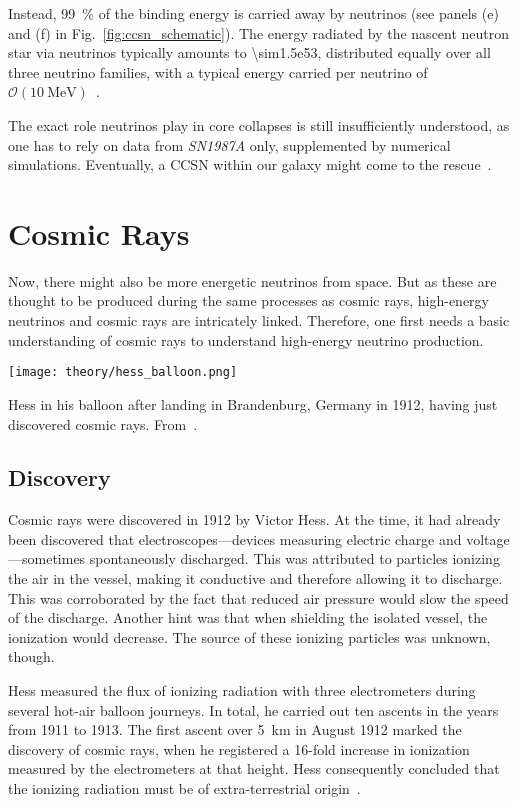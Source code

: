 Instead, \SI{99}{\percent} of the binding energy is carried away by neutrinos (see panels (e) and (f) in Fig.~\ref{fig:ccsn_schematic}). The energy radiated by the nascent neutron star via neutrinos typically amounts to \SI{\sim1.5e53}{\erg}, distributed equally over all three neutrino families, with a typical energy carried per neutrino of $\mathcal{O}(\SI{10}{\mega\eV})$~.

The exact role neutrinos play in core collapses is still insufficiently understood, as one has to rely on data from \emph{SN1987A} only, supplemented by numerical simulations. Eventually, a CCSN within our galaxy might come to the rescue~.

\section{Cosmic Rays}\label{cosmic_rays}

Now, there might also be more energetic neutrinos from space. But as these are thought to be produced during the same processes as cosmic rays, high-energy neutrinos and cosmic rays are intricately linked. Therefore, one first needs a basic understanding of cosmic rays to understand high-energy neutrino production.

\begin{marginfigure}
  \texttt{[image: theory/hess\_balloon.png]}
  \caption[Hess in his balloon]{Hess in his balloon after landing in Brandenburg, Germany in 1912, having just discovered cosmic rays. From~\cite{Steinmaurer1985}.}
\end{marginfigure}

\subsection{Discovery}

Cosmic rays were discovered in 1912 by Victor Hess. At the time, it had already been discovered that electroscopes---devices measuring electric charge and voltage---sometimes spontaneously discharged. This was attributed to particles ionizing the air in the vessel, making it conductive and therefore allowing it to discharge. This was corroborated by the fact that reduced air pressure would slow the speed of the discharge. Another hint was that when shielding the isolated vessel, the ionization would decrease. The source of these ionizing particles was unknown, though.

Hess measured the flux of ionizing radiation with three electrometers during several hot-air balloon journeys. In total, he carried out ten ascents in the years from 1911 to 1913. The first ascent over \SI{5}{\km} in August 1912 marked the discovery of cosmic rays, when he registered a 16-fold increase in ionization measured by the electrometers at that height. Hess consequently concluded that the ionizing radiation must be of extra-terrestrial origin~.

